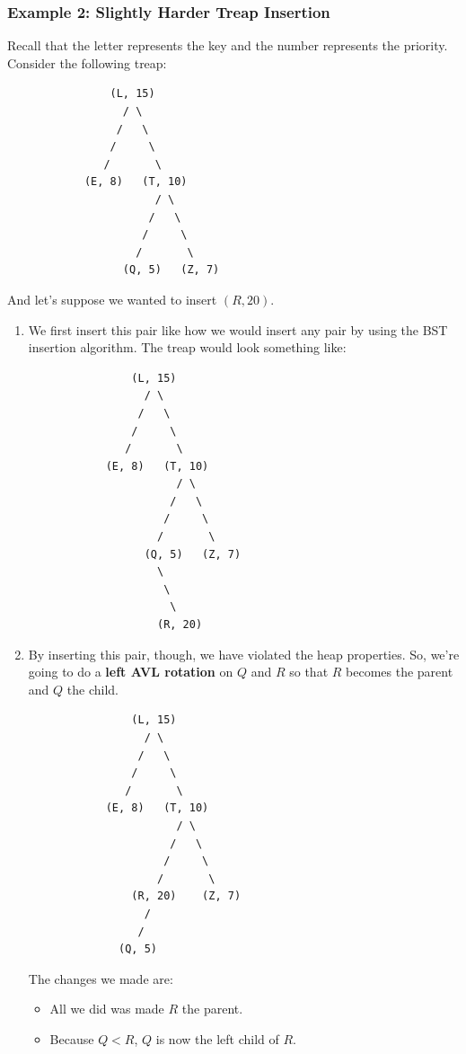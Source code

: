\documentclass[letterpaper]{article}
\begin{document}
\subsubsection{Example 2: Slightly Harder Treap Insertion}
Recall that the letter represents the key and the number represents the priority. Consider the following treap: 
\begin{verbatim}
                (L, 15)
                  / \ 
                 /   \ 
                /     \ 
               /       \ 
            (E, 8)   (T, 10)
                       / \ 
                      /   \ 
                     /     \ 
                    /       \ 
                  (Q, 5)   (Z, 7)
\end{verbatim}
And let's suppose we wanted to insert $(R, 20)$. 
\begin{enumerate}[(1)]
    \item We first insert this pair like how we would insert any pair by using the BST insertion algorithm. The treap would look something like: 
    \begin{verbatim}
                (L, 15)
                  / \ 
                 /   \ 
                /     \ 
               /       \ 
            (E, 8)   (T, 10)
                       / \ 
                      /   \ 
                     /     \ 
                    /       \ 
                  (Q, 5)   (Z, 7)
                    \ 
                     \ 
                      \ 
                    (R, 20)
    \end{verbatim}
    
    \item By inserting this pair, though, we have violated the heap properties. So, we're going to do a \textbf{left AVL rotation} on $Q$ and $R$ so that $R$ becomes the parent and $Q$ the child.  
    \begin{verbatim}
                (L, 15)
                  / \ 
                 /   \ 
                /     \ 
               /       \ 
            (E, 8)   (T, 10)
                       / \ 
                      /   \ 
                     /     \ 
                    /       \ 
                (R, 20)    (Z, 7)
                  /
                 /
              (Q, 5)
    \end{verbatim}
    The changes we made are: 
    \begin{itemize}
        \item All we did was made $R$ the parent. 
        \item Because $Q < R$, $Q$ is now the left child of $R$. 
    \end{itemize}
    

\end{enumerate}
\end{document}
